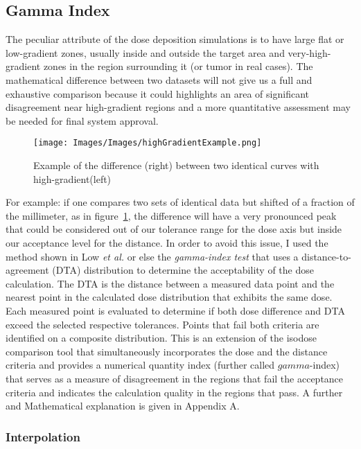 \documentclass[12pt, a4paper, twoside]{book}
\begin{document}
\subsection{Gamma Index}
The peculiar attribute of the dose deposition simulations is to have large flat or low-gradient zones, usually inside and outside the target area and very-high-gradient zones in the region surrounding it (or tumor in real cases).
The mathematical difference between two datasets will not give us a full and exhaustive comparison because it could highlights an area of significant disagreement near high-gradient regions and a more quantitative assessment may be needed for final system approval.   
\begin{figure}[b!]
\texttt{[image: Images/Images/highGradientExample.png]}
\caption{Example of the difference (right) between two identical curves with high-gradient(left)}
\label{fig:highgrad}
\end{figure}
For example: if one compares two sets of identical data but shifted of a fraction of the millimeter, as in figure~\ref{fig:highgrad}, the difference will have a very pronounced peak that could be considered out of our tolerance range for the dose axis but inside our acceptance level for the distance.
In order to avoid this issue, I used the method shown in Low \emph{et al.} \cite{low:gamma} or else the \emph{gamma-index test} that uses a distance-to-agreement (DTA) distribution to determine the acceptability of the dose calculation. The DTA is the distance between a measured data point and the nearest point in the calculated dose distribution that exhibits the same dose. Each measured point is evaluated to determine if both dose difference and DTA exceed the selected respective tolerances. Points that fail both criteria are identified on a composite distribution. This is an extension of the isodose comparison tool that simultaneously incorporates the dose and the distance criteria and provides a numerical quantity index (further called $gamma$-index) that serves as a measure of disagreement in the regions that fail the acceptance criteria and indicates the calculation quality in the regions that pass. A further and Mathematical explanation is given in Appendix A.

\subsubsection{Interpolation}
\end{document}
